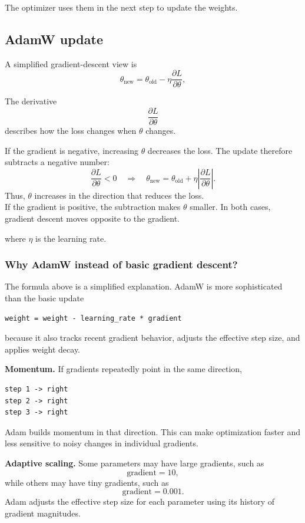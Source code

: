 The optimizer uses them in the next step to update the weights.



\subsection{AdamW update}

A simplified gradient-descent view is
\[
  \theta_{\text{new}}
  =\theta_{\text{old}}
  -\eta\frac{\partial L}{\partial\theta},
\]

The derivative
\[
  \frac{\partial L}{\partial\theta}
\]
describes how the loss changes when \(\theta\) changes.

If the gradient is negative, increasing \(\theta\) decreases the loss. The
update therefore subtracts a negative number:
\[
  \frac{\partial L}{\partial\theta}<0
  \quad\Longrightarrow\quad
  \theta_{\text{new}}
  =\theta_{\text{old}}
  +\eta\left\lvert\frac{\partial L}{\partial\theta}\right\rvert.
\]
Thus, \(\theta\) increases in the direction that reduces the loss. \\ 
If the gradient is positive, the subtraction makes \(\theta\) smaller. 
In both cases, gradient descent moves opposite to the gradient.

where \(\eta\) is the learning rate. \\


\subsubsection*{Why AdamW instead of basic gradient descent?}

The formula above is a simplified explanation. AdamW is more sophisticated
than the basic update
\begin{lstlisting}[style=shadedpython,language={}]
weight = weight - learning_rate * gradient
\end{lstlisting}
because it also tracks recent gradient behavior, adjusts the effective step
size, and applies weight decay.

\textbf{Momentum.} If gradients repeatedly point in the same direction,
\begin{lstlisting}[style=shadedpython,language={}]
step 1 -> right
step 2 -> right
step 3 -> right
\end{lstlisting}
Adam builds momentum in that direction. This can make optimization faster and
less sensitive to noisy changes in individual gradients.

\textbf{Adaptive scaling.} Some parameters may have large gradients, such as
\[
  \text{gradient}=10,
\]
while others may have tiny gradients, such as
\[
  \text{gradient}=0.001.
\]
Adam adjusts the effective step size for each parameter using its history of
gradient magnitudes.

